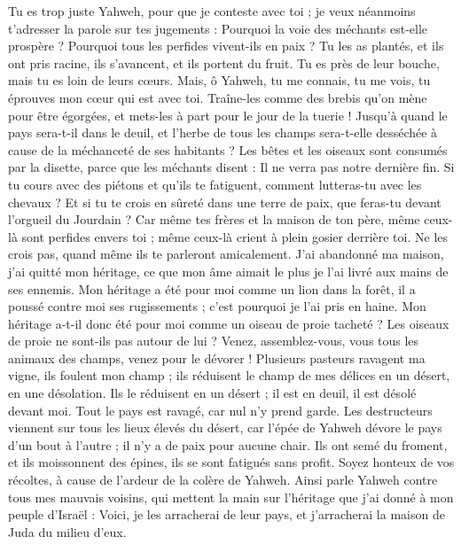 \begin{multicols}{2}
\VerseOne{}Tu es trop juste Yahweh, pour que je conteste avec toi ; je veux néanmoins t'adresser la parole sur tes jugements : Pourquoi la voie des méchants est-elle prospère ? Pourquoi tous les perfides vivent-ils en paix ?
Tu les as plantés, et ils ont pris racine, ils s'avancent, et ils portent du fruit. Tu es près de leur bouche, mais tu es loin de leurs cœurs.
Mais, ô Yahweh, tu me connais, tu me vois, tu éprouves mon cœur qui est avec toi. Traîne-les comme des brebis qu'on mène pour être égorgées, et mets-les à part pour le jour de la tuerie !
Jusqu'à quand le pays sera-t-il dans le deuil, et l'herbe de tous les champs sera-t-elle desséchée à cause de la méchanceté de ses habitants ? Les bêtes et les oiseaux sont consumés par la disette, parce que les méchants disent : Il ne verra pas notre dernière fin.
Si tu cours avec des piétons et qu'ils te fatiguent, comment lutteras-tu avec les chevaux ? Et si tu te crois en sûreté dans une terre de paix, que feras-tu devant l'orgueil du Jourdain ?
Car même tes frères et la maison de ton père, même ceux-là sont perfides envers toi ; même ceux-là crient à plein gosier derrière toi. Ne les crois pas, quand même ils te parleront amicalement.
J'ai abandonné ma maison, j'ai quitté mon héritage, ce que mon âme aimait le plus je l'ai livré aux mains de ses ennemis.
Mon héritage a été pour moi comme un lion dans la forêt, il a poussé contre moi ses rugissements ; c'est pourquoi je l'ai pris en haine.
Mon héritage a-t-il donc été pour moi comme un oiseau de proie tacheté ? Les oiseaux de proie ne sont-ils pas autour de lui ? Venez, assemblez-vous, vous tous les animaux des champs, venez pour le dévorer !
Plusieurs pasteurs ravagent ma vigne, ils foulent mon champ ; ils réduisent le champ de mes délices en un désert, en une désolation.
Ils le réduisent en un désert ; il est en deuil, il est désolé devant moi. Tout le pays est ravagé, car nul n'y prend garde.
Les destructeurs viennent sur tous les lieux élevés du désert, car l'épée de Yahweh dévore le pays d'un bout à l'autre ; il n'y a de paix pour aucune chair.
Ils ont semé du froment, et ils moissonnent des épines, ils se sont fatigués sans profit. Soyez honteux de vos récoltes, à cause de l'ardeur de la colère de Yahweh.
Ainsi parle Yahweh contre tous mes mauvais voisins, qui mettent la main sur l'héritage que j'ai donné à mon peuple d'Israël : Voici, je les arracherai de leur pays, et j'arracherai la maison de Juda du milieu d'eux.

\end{multicols}
